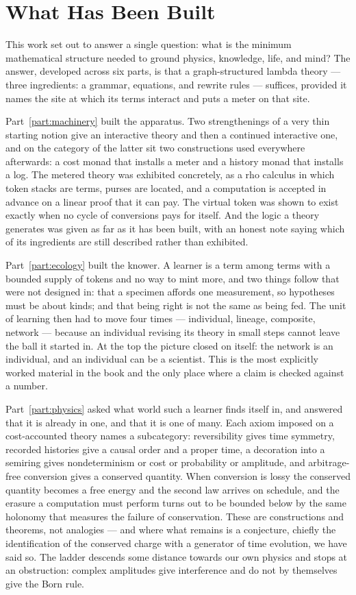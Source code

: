 \chapter*{What Has Been Built}

This work set out to answer a single question: what is the minimum
mathematical structure needed to ground physics, knowledge, life, and
mind?
The answer, developed across six parts, is that a graph-structured lambda
theory --- three ingredients: a grammar, equations, and rewrite rules ---
suffices, provided it names the site at which its terms interact and puts
a meter on that site.

Part~\ref{part:machinery} built the apparatus.
Two strengthenings of a very thin starting notion give an interactive
theory and then a continued interactive one, and on the category of the
latter sit two constructions used everywhere afterwards: a cost monad
that installs a meter and a history monad that installs a log.
The metered theory was exhibited concretely, as a rho calculus in which
token stacks are terms, purses are located, and a computation is accepted
in advance on a linear proof that it can pay.
The virtual token was shown to exist exactly when no cycle of conversions
pays for itself.
And the logic a theory generates was given as far as it has been built,
with an honest note saying which of its ingredients are still described
rather than exhibited.

Part~\ref{part:ecology} built the knower.
A learner is a term among terms with a bounded supply of tokens and no
way to mint more, and two things follow that were not designed in: that a
specimen affords one measurement, so hypotheses must be about kinds; and
that being right is not the same as being fed.
The unit of learning then had to move four times --- individual, lineage,
composite, network --- because an individual revising its theory in small
steps cannot leave the ball it started in.
At the top the picture closed on itself: the network is an individual,
and an individual can be a scientist.
This is the most explicitly worked material in the book and the only
place where a claim is checked against a number.

Part~\ref{part:physics} asked what world such a learner finds itself in,
and answered that it is already in one, and that it is one of many.
Each axiom imposed on a cost-accounted theory names a subcategory:
reversibility gives time symmetry, recorded histories give a causal order
and a proper time, a decoration into a semiring gives nondeterminism or
cost or probability or amplitude, and arbitrage-free conversion gives a
conserved quantity.
When conversion is lossy the conserved quantity becomes a free energy and
the second law arrives on schedule, and the erasure a computation must
perform turns out to be bounded below by the same holonomy that measures
the failure of conservation.
These are constructions and theorems, not analogies --- and where what
remains is a conjecture, chiefly the identification of the conserved
charge with a generator of time evolution, we have said so.
The ladder descends some distance towards our own physics and stops at an
obstruction: complex amplitudes give interference and do not by
themselves give the Born rule.

